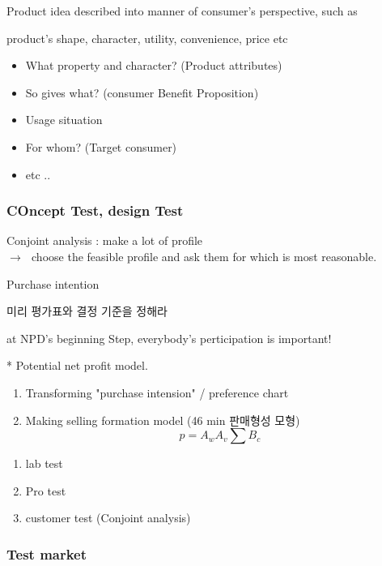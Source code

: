 \documentclass[12pt]{article}
\newcommand{\ra}{$\rightarrow \text{ }$}
\begin{document}
\begin{tcolorbox}
	Product idea described into manner of consumer's perspective, such as

	product's shape, character, utility, convenience, price etc

\end{tcolorbox}

\begin{itemize}
	\item What property and character? (Product attributes)
	\item So gives what? (consumer Benefit Proposition)
	\item  Usage situation
	\item For whom? (Target consumer)
	\item etc ..
\end{itemize}

\subsubsection{COncept Test, design Test}

Conjoint analysis : make a lot of profile \\
\ra choose the feasible profile and ask them for which is most reasonable.

Purchase intention

미리 평가표와 결정 기준을 정해라

at NPD's beginning Step, everybody's perticipation is important!



 * Potential net profit model.

\begin{enumerate}
	\item Transforming "purchase intension" / preference chart
	\item Making selling formation model (46 min 판매형성 모형)
	\[
	 p = A_w A_v \sum B_c
	\]
\end{enumerate}
\begin{enumerate}
	\item lab test
	\item Pro test
	\item customer test (Conjoint analysis)
\end{enumerate}

\subsubsection{Test market}
\end{document}
